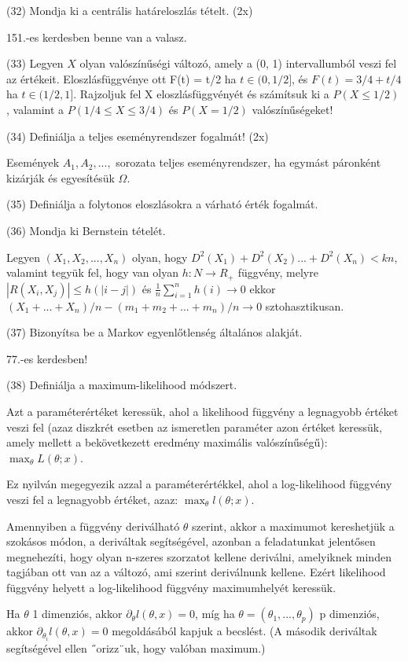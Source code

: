 \documentclass[12p]{article}
\begin{document}
(32) Mondja ki a centrális határeloszlás tételt. (2x)

151.-es kerdesben benne van a valasz.

(33) Legyen $X$ olyan valószínűségi változó, amely a (0, 1) intervallumból veszi fel az értékeit. Eloszlásfüggvénye ott F(t) = t/2 ha $t \in (0, 1/2]$, és $F(t) = 3/4 + t/4$ ha $t \in (1/2, 1]$. Rajzoljuk fel X eloszlásfüggvényét és számítsuk ki a $P(X \leq 1/2)$, valamint a $P(1/4 \leq X \leq 3/4)$ és $P(X = 1/2)$ valószínűségeket!

(34) Definiálja a teljes eseményrendszer fogalmát! (2x)

Események $A_1, A_2, ...,$ sorozata teljes eseményrendszer, ha
egymást páronként kizárják és egyesítésük $\Omega$.

(35) Definiálja a folytonos eloszlásokra a várható érték fogalmát.

(36) Mondja ki Bernstein tételét.

Legyen $(X_1, X_2, ..., X_n)$ olyan, hogy $D^2(X_1) + D^2(X_2) ... + D^2(X_n) < kn$, valamint tegyük fel, hogy van olyan $h: N \rightarrow R_{+}$ függvény, melyre $|R(X_i, X_j)| \leq h(|i-j|)$ és $\frac{1}{n} \displaystyle{\sum^n_{i=1}} h(i) \rightarrow 0$ ekkor $(X_1 + ... + X_n) / n - (m_1 + m_2 + ... + m_n)/n \rightarrow 0$ sztohasztikusan.

(37) Bizonyítsa be a Markov egyenlőtlenség általános alakját.

77.-es kerdesben!

(38) Definiálja a maximum-likelihood módszert.

Azt a paraméterértéket keressük, ahol a likelihood függvény a legnagyobb értéket veszi fel (azaz diszkrét esetben az
ismeretlen paraméter azon értéket keressük, amely mellett a bekövetkezett eredmény maximális valószínűségű): $\max_{\theta}L(\theta; x)$.

Ez nyilván megegyezik azzal a paraméterértékkel, ahol a log-likelihood függvény veszi fel a legnagyobb
értéket, azaz: $\max_{\theta} l(\theta; x)$.

Amennyiben a függvény deriválható $\theta$ szerint, akkor a maximumot kereshetjük a szokásos módon, a deriváltak
segítségével, azonban a feladatunkat jelentősen megnehezíti, hogy olyan n-szeres szorzatot kellene deriválni, amelyiknek minden tagjában ott van az a változó, ami szerint deriválnunk kellene. Ezért likelihood függvény helyett a log-likelihood függvény maximumhelyét keressük.

Ha $\theta$ 1 dimenziós, akkor $\partial_\theta l(\theta, x) = 0$, míg ha $\theta = (\theta_1, ..., \theta_p)$ p dimenziós, akkor $\partial_{\theta_i} l(\theta, x) = 0$ megoldásából
kapjuk a becslést. (A második deriváltak segítségével ellen ˝orizz¨uk, hogy valóban maximum.)
\end{document}
